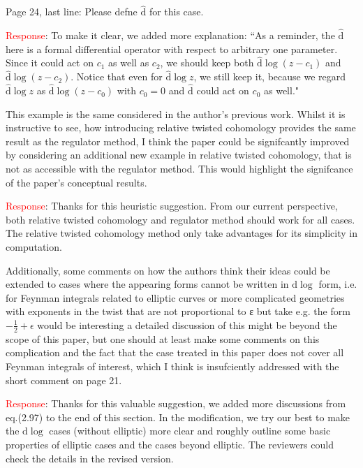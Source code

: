 \documentclass[12pt,superscriptaddress]{revtex4}
\newcommand{\nd}{\mathrm{d}}
\newcommand{\nds}{\hat{\mathrm{d}}}
\newcommand{\ep}{\epsilon}
\begin{document}
\begin{center}
{
\parbox{1\linewidth}
  {
  Page 24, last line: Please defne $\nds$ for this case.
  }
}
\end{center}
\noindent\textcolor{red}{Response}:
To make it clear, we added more explanation: ``As a reminder, the $\nds$ here is a formal differential operator with respect to arbitrary one parameter. Since it could act on $c_1$ as well as  $c_2$, we should keep both $\nds \log (z-c_1)$ and $\nds \log (z-c_2)$. Notice that even for $\nds \log z$, we still keep it, because  we regard $\nds \log z$ as $\nds \log (z-c_0)$ with $c_0=0$ and $\nds$ could act on $c_0$ as well."


\begin{center}
{
\parbox{1\linewidth}
  {
  This example is the same considered in the author’s previous work. Whilst it is instructive to see, how introducing relative twisted cohomology provides the same result as the regulator method, I think the paper could be signifcantly improved by considering an additional new example in relative twisted cohomology, that is not as accessible with the regulator method. This would highlight the signifcance of the paper’s conceptual results.
  }
}
\end{center}
\noindent\textcolor{red}{Response}:
Thanks for this heuristic suggestion. From our current perspective, both relative twisted cohomology and regulator method should work for all cases. The relative twisted cohomology method only take advantages for its simplicity in computation.


\begin{center}
{
\parbox{1\linewidth}
  {
  Additionally, some comments on how the authors think their ideas could be extended to cases where the appearing forms cannot be written
in $\nd \log$ form, i.e. for Feynman integrals related to elliptic curves or more complicated geometries with exponents in the twist that are not proportional to ε but take e.g. the form $-\frac{1}{2}+\ep$ would be interesting a detailed discussion of this might be beyond the scope of this paper, but one should at least make some comments on this complication and the fact that the case treated in this paper does not cover all Feynman
integrals of interest, which I think is insufciently addressed with the short comment on page 21.
  }
}
\end{center}
\noindent\textcolor{red}{Response}:
Thanks for this valuable suggestion, we added more discussions from eq.(2.97) to the end of this section. In the modification, we try our best to make the $\nd \log$ cases (without elliptic) more clear and roughly outline some basic properties of elliptic cases and the cases beyond elliptic. The reviewers could check the details in the revised version.
\end{document}

